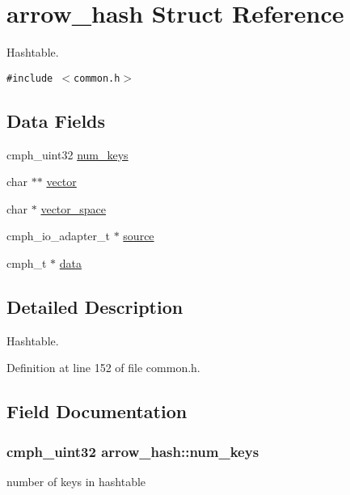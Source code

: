 \hypertarget{structarrow__hash}{
\section{arrow\_\-hash Struct Reference}
\label{structarrow__hash}
}
Hashtable.  


{\tt \#include $<$common.h$>$}

\subsection*{Data Fields}
\begin{CompactItemize}
\item 
cmph\_\-uint32 \hyperlink{structarrow__hash_f75ec1b9382f5b646007f8acb0521c15}{num\_\-keys}
\item 
char $\ast$$\ast$ \hyperlink{structarrow__hash_91eeed74d32d354b4e8b03be8b51f058}{vector}
\item 
char $\ast$ \hyperlink{structarrow__hash_298c5f151d99d62d6be200a620a4b4c3}{vector\_\-space}
\item 
cmph\_\-io\_\-adapter\_\-t $\ast$ \hyperlink{structarrow__hash_202a3f5b2689ae35543ef2c7ea84a6c2}{source}
\item 
cmph\_\-t $\ast$ \hyperlink{structarrow__hash_9f6c6f476d93187dd1436eac92bd8d53}{data}
\end{CompactItemize}


\subsection{Detailed Description}
Hashtable. 

Definition at line 152 of file common.h.

\subsection{Field Documentation}
\hypertarget{structarrow__hash_f75ec1b9382f5b646007f8acb0521c15}{
\subsubsection{\setlength{\rightskip}{0pt plus 5cm}cmph\_\-uint32 {\bf arrow\_\-hash::num\_\-keys}}}
\label{structarrow__hash_f75ec1b9382f5b646007f8acb0521c15}


number of keys in hashtable 

